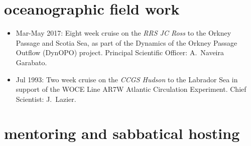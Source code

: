 \documentclass{article}
\begin{document}
\newpage 

\section*{\sc \color{Maroon}  oceanographic field work}
\vspace{-.25cm}

\begin{itemize}[leftmargin=*]
 \item 
 Mar-May 2017: Eight week cruise on the {\it RRS JC Ross}  to the Orkney Passage and Scotia Sea,
  as part of the
  Dynamics of the Orkney Passage Outflow (DynOPO) project. Principal Scientific Officer: A.\ Naveira Garabato. 
 \item 
  Jul 1993: Two week cruise on the {\it CCGS Hudson} to the Labrador Sea in support of  the WOCE Line AR7W Atlantic Circulation Experiment. Chief Scientist: J.\ Lazier.
\end{itemize}



\section*{\sc  \color{Maroon} mentoring and sabbatical hosting}
\vspace{-.25cm}
\end{document}
